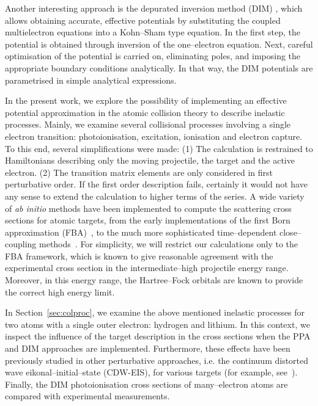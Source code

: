 \documentclass[10pt]{article}
\begin{document}
Another interesting approach is the depurated inversion method 
(DIM) \cite{Mendez2015,Mendez2016,Mendez2018}, which allows
obtaining accurate, effective potentials by substituting the coupled 
multielectron equations into a Kohn--Sham type equation. 
In the first step, the potential is obtained through inversion of the 
one--electron equation. Next, careful optimisation of the potential is 
carried on, eliminating poles, and imposing the appropriate boundary 
conditions analytically. In that way, the DIM potentials are parametrised 
in simple analytical expressions.

In the present work, we explore the possibility of implementing an 
effective potential approximation in the atomic collision theory to 
describe inelastic processes. Mainly, we examine several collisional 
processes involving 
a single electron transition: photoionisation, excitation, ionisation 
and electron capture. To this end, several simplifications were made: 
(1) The calculation is restrained to Hamiltonians describing only
the moving projectile, the target and the active 
electron. (2) The transition matrix elements are only considered in  
first perturbative order. If the first order description fails, certainly
it would not have any sense to extend the calculation to higher terms of 
the series.
A wide variety of {\it ab initio} methods have been 
implemented to compute the scattering cross sections for atomic targets, 
from the early implementations of the first Born 
approximation (FBA)~\cite{BatesBook,McDowell1961,photoion}, to the much 
more sophisticated time--dependent close--coupling 
methods~\cite{LeePindzola2011,Ionization999}. For simplicity, we will 
restrict our calculations only to the FBA framework, 
which is known to give reasonable agreement with 
the experimental cross section in the intermediate--high projectile 
energy range. Moreover, in this energy range, the Hartree--Fock orbitals
are known to provide the correct high energy limit.

In Section~\ref{sec:colproc}, we examine the above mentioned 
inelastic processes for two atoms with a single outer electron: 
hydrogen and lithium. 
In this context, we inspect the influence of the target description 
in the cross sections when the PPA and DIM approaches are implemented. 
Furthermore, these effects have been previously studied in other 
perturbative approaches, i.e. the continuum distorted wave 
eikonal--initial--state (CDW-EIS), for various targets (for example,
see~\cite{Kirchner1998,Fiori2001}).
Finally, the DIM photoionisation cross sections of many--electron 
atoms are compared with experimental measurements. 
\end{document}
